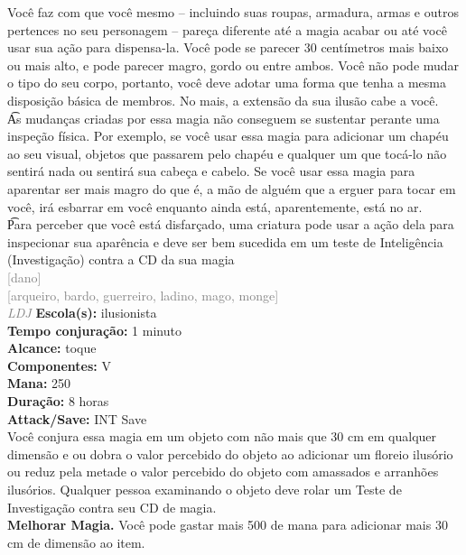 \documentclass{RPG_Adventure}[2021/10/20]
\begin{document}
{\normalsize Você faz com que você mesmo – incluindo suas roupas, armadura, armas e outros pertences no seu personagem – pareça diferente até a magia acabar ou até você usar sua ação para dispensa-la. Você pode se parecer 30 centímetros mais baixo ou mais alto, e pode parecer magro, gordo ou entre ambos. Você não pode mudar o tipo do seu corpo, portanto, você deve adotar uma forma que tenha a mesma disposição básica de membros. No mais, a extensão da sua ilusão cabe a você.\\\t As mudanças criadas por essa magia não conseguem se sustentar perante uma inspeção física. Por exemplo, se você usar essa magia para adicionar um chapéu ao seu visual, objetos que passarem pelo chapéu e qualquer um que tocá-lo não sentirá nada ou sentirá sua cabeça e cabelo. Se você usar essa magia para aparentar ser mais magro do que é, a mão de alguém que a erguer para tocar em você, irá esbarrar em você enquanto ainda está, aparentemente, está no ar.\\\t Para perceber que você está disfarçado, uma criatura pode usar a ação dela para inspecionar sua aparência e deve ser bem sucedida em um teste de Inteligência (Investigação) contra a CD da sua magia\\}
{\scriptsize \textcolor{gray}{[dano]\\}}
{\scriptsize \textcolor{gray}{[arqueiro, bardo, guerreiro, ladino, mago, monge]\\}}
{\tiny \textcolor{gray}{\textit{LDJ}}}\jump{}
{\small \t \textbf{Escola(s):} ilusionista\\\t \textbf{Tempo conjuração:} 1 minuto\\\t \textbf{Alcance:} toque\\\t \textbf{Componentes:} V\\\t \textbf{Mana:} 250\\\t \textbf{Duração:} 8 horas\\\t \textbf{Attack/Save:} INT Save\\}
{\normalsize Você conjura essa magia em um objeto com não mais que 30 cm em qualquer dimensão e ou dobra o valor percebido do objeto ao adicionar um floreio ilusório ou reduz pela metade o valor percebido do objeto com amassados e arranhões ilusórios. Qualquer pessoa examinando o objeto deve rolar um Teste de Investigação contra seu CD de magia.\\\t \textbf{Melhorar Magia.} Você pode gastar mais 500 de mana para adicionar mais 30 cm de dimensão ao item.\\}
\end{document}
